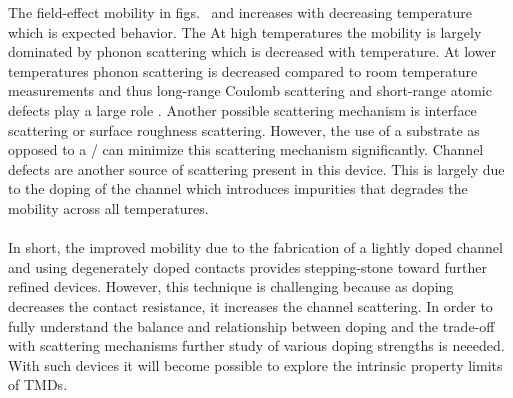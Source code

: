 \noindent The field-effect mobility in figs.~ and  increases with decreasing temperature which is expected behavior. The  At high temperatures the mobility is largely dominated by phonon scattering which is decreased with temperature. At lower temperatures phonon scattering is decreased compared to room temperature measurements and thus long-range Coulomb scattering and short-range atomic defects play a large role \cite{Ando_RevModPhys1982}. Another possible scattering mechanism is interface scattering or surface roughness scattering. However, the use of a \hbn substrate as opposed to a / can minimize this scattering mechanism significantly. Channel defects are another source of scattering present in this device. This is largely due to the doping of the  channel which introduces impurities that degrades the mobility across all temperatures. \\ \\

\noindent In short, the improved mobility due to the fabrication of a lightly doped channel and using degenerately doped contacts provides stepping-stone toward further refined devices. However, this technique is challenging because as doping decreases the contact resistance, it increases the channel scattering. In order to fully understand the balance and relationship between doping and the trade-off with scattering mechanisms further study of various doping strengths is neeeded. With such devices it will become possible to explore the intrinsic property limits of \acp{TMD}.
